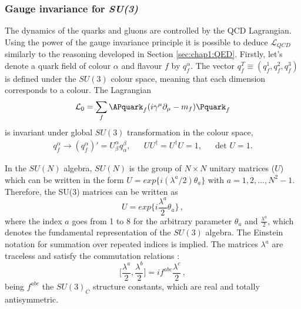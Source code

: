 \subsubsection{Gauge invariance for \textit{SU(3)}}%
The dynamics of the quarks and gluons are controlled by the QCD Lagrangian. Using the power of the gauge invariance principle 
it is possible to deduce $\mathcal{L}_{QCD}$ similarly to the reasoning developed in Section \ref{sec:chap1:QED}.
Firstly, let's denote a quark field of colour $\alpha$ and flavour $f$ by $q_{f}^{\alpha}$. 
The vector $q^{T}_{f}\equiv (q_{f}^{1}, q_{f}^{2}, q_{f}^{3})$ is defined under the $SU(3)$ colour space,  
meaning that each dimension corresponds to a colour.
The Lagrangian
\begin{equation}\label{eq:chap1:QCD:Lagrangian_0}
\mathcal{L}_{0} = \sum_{f} \APquark_{f} (i \gamma^{\mu} \partial_{\mu} - m_{f})\Pquark_{f}
\end{equation}
is invariant under global $SU(3)$ transformation in the colour space,
\begin{align} \label{eq:chap1:QCD:q_trasnformation}
q_{f}^{\alpha} \rightarrow (q_{f}^{\alpha})' = U^{\alpha}_{\beta}q^{\beta}_{\alpha}, && UU^{\dagger} = U^{\dagger}U = 1, && \textrm{det }U = 1 .
\end{align}

In the $SU(N)$ algebra, $SU(N)$ is the group of $N \times N$ unitary matrices ($U$) which can be written in the form $U = exp \{ i (\lambda^{a}/2) \theta_{a} \}$ with $a = 1,2,...,N^{2}-1$.
Therefore, the SU(3) matrices can be written as
\begin{equation}\label{eq:chap1:QCD:U_matrix}
	U = exp \big\{ i \frac{\lambda^{a}}{2}\theta_{a} \big\}\, ,
\end{equation}
where the index $a$ goes from 1 to 8 for the arbitrary parameter $\theta_{a}$ and  $\frac{\lambda^{a}}{2}$, which denotes the fundamental representation of the $SU(3)$ algebra.
The Einstein notation for summation over repeated indices is implied. The matrices $\lambda^{a}$ are traceless and satisfy the commutation relations \cite{Pich:2007vu}:
\begin{equation} \label{eq:chap1:QCD:ConmutationSU3}
	\big[ \frac{\lambda^{a}}{2}, \frac{\lambda^{b}}{2}\big] = i f^{abc} \frac{\lambda^{c}}{2} \, ,
\end{equation}
being $f^{abc}$ the $SU(3)_C$ structure constants, which are real and totally antisymmetric. 


